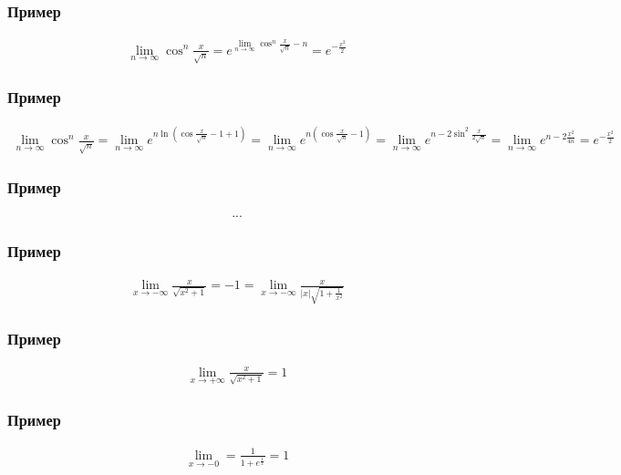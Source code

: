 \documentclass{article}
\begin{document}
\subsubsection{Пример}
\begin{gather*}
    \lim_{n \to \infty} \cos^n \frac{x}{\sqrt{n}} = 
    e^{\lim_{n \to \infty} \cos^n \frac{x}{\sqrt{n}} - n} = 
    e^{-\frac{x^2}{2}}
\end{gather*}

\subsubsection{Пример}
\begin{gather*}
    \lim_{n \to \infty} \cos^n \frac{x}{\sqrt{n}} = 
    \lim_{n \to \infty} e^{n \ln (\cos \frac{x}{\sqrt{n}} - 1 + 1)} = 
    \lim_{n \to \infty} e^{n (\cos \frac{x}{\sqrt{n}} - 1)} =
    \lim_{n \to \infty} e^{n -2\sin^2 \frac{x}{2 \sqrt{n}}} =
    \lim_{n \to \infty} e^{n -2 \frac{x^2}{4n}} = e^{-\frac{x^2}{2}}
\end{gather*}

\subsubsection{Пример}
\begin{gather*}
    ...
\end{gather*}

\subsubsection{Пример}
\begin{gather*}
    \lim_{x \to -\infty} \frac{x}{\sqrt{x^2 + 1}} = -1 = 
    \lim_{x \to -\infty} \frac{x}{|x| \sqrt{1 + \frac{1}{x^2}}}
\end{gather*}

\subsubsection{Пример}
\begin{gather*}
    \lim_{x \to +\infty} \frac{x}{\sqrt{x^2 + 1}} = 1
\end{gather*}

\subsubsection{Пример}
\begin{gather*}
    \lim_{x \to -0} = \frac{1}{1 + e^{\frac{1}{x}}} = 1
\end{gather*}
\end{document}
